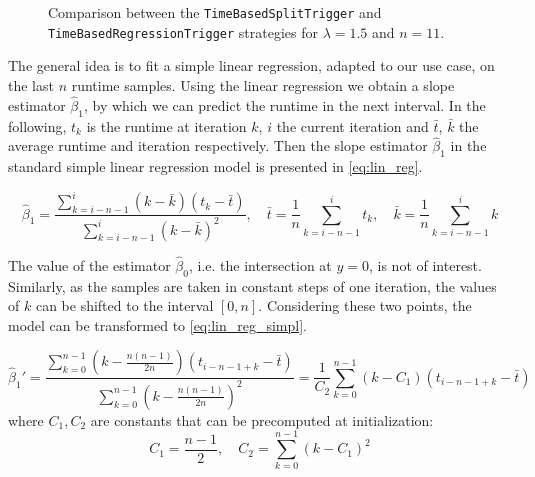 \begin{figure}[htpb]
\begin{subfigure}{0.5\textwidth}
	\end{subfigure}
	\caption{Comparison between the \texttt{TimeBasedSplitTrigger} and \texttt{TimeBasedRegressionTrigger} strategies for $\lambda=1.5$ and $n=11$.}
	\label{fig:split_vs_regression}
\end{figure}



The general idea is to fit a simple linear regression, adapted to our use case, on the last $n$ runtime samples. Using the linear regression we obtain a slope estimator $\hat{\beta}_1$, by which we can predict the runtime in the next interval. In the following, $t_k$ is the runtime at iteration $k$, $i$ the current iteration and $\bar t$, $\bar k$ the average runtime and iteration respectively. Then the slope estimator $\hat{\beta}_1$ in the standard simple linear regression model is presented in \eqref{eq:lin_reg}.


\begin{equation}
	\hat{\beta}_1=\frac{\sum_{k=i-n-1}^{i}(k-\bar k)(t_k-\bar t)}{\sum_{k=i-n-1}^{i}(k-\bar k)^2},\quad\bar t=\frac{1}{n}\sum_{k=i-n-1}^it_k, \quad \bar k = \frac{1}{n}\sum_{k=i-n-1}^ik\label{eq:lin_reg}
\end{equation}

The value of the estimator $\hat\beta_0$, i.e. the intersection at $y=0$, is not of interest. Similarly, as the samples are taken in constant steps of one iteration, the values of $k$ can be shifted to the interval $[0, n]$. Considering these two points, the model can be transformed to \eqref{eq:lin_reg_simpl}.

\begin{equation}
	\hat{\beta}_1' =\frac{\sum_{k=0}^{n-1}\left(k-\frac{n(n-1)}{2n}\right)(t_{i-n-1+k}-\bar t)}{\sum_{k=0}^{n-1}\left(k-\frac{n(n-1)}{2n}\right)^2}= \frac{1}{C_2}\sum_{k=0}^{n-1}\left(k-C_1\right)(t_{i-n-1+k}-\bar t)\label{eq:lin_reg_simpl}
\end{equation}
where $C_1, C_2$ are constants that can be precomputed at initialization:
\begin{equation}
	C_1 = \frac{n-1}{2}, \quad C_2=\sum_{k=0}^{n-1}\left(k-C_1\right)^2\label{eq:lin_reg_consts}
\end{equation}


